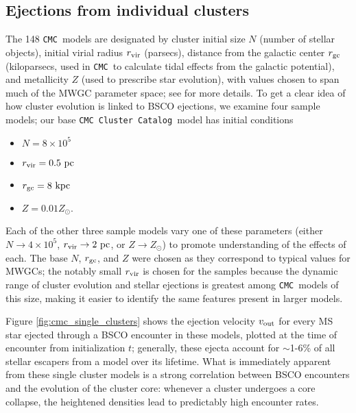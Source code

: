 \documentclass[twocolumn]{aastex631}
\newcommand{\CMC}{\texttt{CMC}}
\newcommand{\CMCcat}{\texttt{CMC Cluster Catalog}}
\begin{document}
\subsection{Ejections from individual clusters} \label{subsec:single_clusters}

The 148 \CMC\ models are designated by cluster initial size $N$ (number of stellar objects), initial virial radius $r_{\rm vir}$ (parsecs), distance from the galactic center $r_{\rm gc}$ (kiloparsecs, used in \CMC\ to calculate tidal effects from the galactic potential), and metallicity $Z$ (used to prescribe star evolution), with values chosen to span much of the MWGC parameter space; see \citet{2020IAUS..351..357K} for more details.
To get a clear idea of how cluster evolution is linked to BSCO ejections, we examine four sample models; our base \CMCcat\ model has initial conditions
\begin{itemize}
    \item $N = 8 \times 10^5$
    \item $r_{\rm vir} = 0.5~{\rm pc}$
    \item $r_{\rm gc} = 8~{\rm kpc}$
    \item $Z = 0.01Z_\odot$.
\end{itemize}
Each of the other three sample models vary one of these parameters (either $N \to 4 \times 10^5$, $r_{\rm vir} \to 2~{\rm pc}$, or $Z \to Z_\odot$) to promote understanding of the effects of each.
The base $N$, $r_{\rm gc}$, and $Z$ were chosen as they correspond to typical values for MWGCs; the notably small $r_{\rm vir}$ is chosen for the samples because the dynamic range of cluster evolution and stellar ejections is greatest among \CMC\ models of this size, making it easier to identify the same features present in larger models.

Figure \ref{fig:cmc_single_clusters} shows the ejection velocity $v_{\rm out}$ for every MS star ejected through a BSCO encounter in these models, plotted at the time of encounter from initialization $t$; generally, these ejecta account for $\sim$1-6\% of all stellar escapers from a model over its lifetime.
What is immediately apparent from these single cluster models is a strong correlation between BSCO encounters and the evolution of the cluster core: whenever a cluster undergoes a core collapse, the heightened densities lead to predictably high encounter rates.
\end{document}
